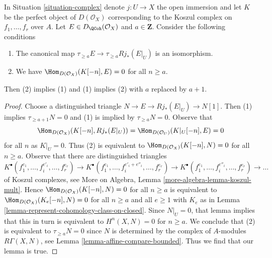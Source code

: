 \begin{lemma}
\label{lemma-orthogonal-koszul-first-variant}
In Situation \ref{situation-complex} denote $j : U \to X$ the open
immersion and let $K$ be the perfect object of $D(\mathcal{O}_X)$
corresponding to the Koszul complex on $f_1, \ldots, f_r$ over $A$.
Let $E \in D_\QCoh(\mathcal{O}_X)$ and $a \in \mathbf{Z}$.
Consider the following conditions
\begin{enumerate}
\item The canonical map $\tau_{\geq a}E \to \tau_{\geq a} Rj_*(E|_U)$
is an isomorphism.
\item We have $\Hom_{D(\mathcal{O}_X)}(K[-n], E) = 0$ for all $n \geq a$.
\end{enumerate}
Then (2) implies (1) and (1) implies (2) with $a$ replaced by $a + 1$.
\end{lemma}

\begin{proof}
Choose a distinguished triangle $N \to E \to Rj_*(E|_U) \to N[1]$.
Then (1) implies $\tau_{\geq a + 1} N = 0$ and (1) is implied by
$\tau_{\geq a}N = 0$. Observe that
$$
\Hom_{D(\mathcal{O}_X)}(K[-n], Rj_*(E|_U)) =
\Hom_{D(\mathcal{O}_U)}(K|_U[-n], E) = 0
$$
for all $n$ as $K|_U = 0$. Thus (2) is equivalent to
$\Hom_{D(\mathcal{O}_X)}(K[-n], N) = 0$ for all $n \geq a$. 
Observe that there are distinguished triangles
$$
K^\bullet(f_1^{e_1}, \ldots, f_i^{e'_i}, \ldots, f_r^{e_r}) \to
K^\bullet(f_1^{e_1}, \ldots, f_i^{e'_i + e''_i}, \ldots, f_r^{e_r}) \to
K^\bullet(f_1^{e_1}, \ldots, f_i^{e''_i}, \ldots, f_r^{e_r}) \to \ldots
$$
of Koszul complexes, see
More on Algebra, Lemma \ref{more-algebra-lemma-koszul-mult}. Hence
$\Hom_{D(\mathcal{O}_X)}(K[-n], N) = 0$ for all $n \geq a$
is equivalent to
$\Hom_{D(\mathcal{O}_X)}(K_e[-n], N) = 0$ for all $n \geq a$ and
all $e \geq 1$ with $K_e$ as in
Lemma \ref{lemma-represent-cohomology-class-on-closed}.
Since $N|_U = 0$, that lemma implies that this in turn is equivalent to
$H^n(X, N) = 0$ for $n \geq a$. We conclude that (2) is equivalent
to $\tau_{\geq a}N = 0$ since $N$ is determined by the complex of
$A$-modules $R\Gamma(X, N)$, see Lemma \ref{lemma-affine-compare-bounded}.
Thus we find that our lemma is true.
\end{proof}
